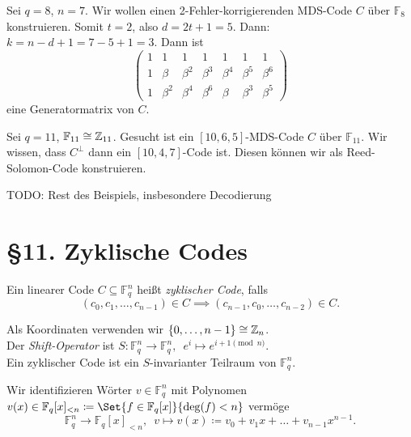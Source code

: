 \documentclass{cheat-sheet}
\newcommand{\F}{\mathbb{F}} %
\begin{document}

\begin{bsp}
  Sei $q = 8$, $n = 7$.
  Wir wollen einen 2-Fehler-korrigierenden MDS-Code $C$ über $\F_8$ konstruieren.
  Somit $t = 2$, also $d = 2t + 1 = 5$.
  Dann: $k = n - d + 1 = 7 - 5 + 1 = 3$.
  Dann ist
  \[
    \begin{pmatrix}
      1 & 1 & 1 & 1 & 1 & 1 & 1 \\
      1 & \beta & \beta^2 & \beta^3 & \beta^4 & \beta^5 & \beta^6 \\
      1 & \beta^2 & \beta^4 & \beta^6 & \beta & \beta^3 & \beta^5
    \end{pmatrix}
  \]
  eine Generatormatrix von $C$.
\end{bsp}

\begin{bsp}
  Sei $q = 11$, $\F_{11} \cong \Z_{11}$.
  Gesucht ist ein $[10, 6, 5]$-MDS-Code $C$ über $\F_{11}$.
  Wir wissen, dass $C^\perp$ dann ein $[10, 4, 7]$-Code ist.
  Diesen können wir als Reed-Solomon-Code konstruieren.
\end{bsp}

TODO: Rest des Beispiels, insbesondere Decodierung


\section{§11. Zyklische Codes}


\begin{defn}
  Ein linearer Code $C \subseteq \F_q^n$ heißt \emph{zyklischer Code}, falls
  \[
    (c_0, c_1, \ldots, c_{n-1}) \in C \implies
    (c_{n-1}, c_0, \ldots, c_{n-2}) \in C.
  \]
\end{defn}

\begin{bem}
  Als Koordinaten verwenden wir $\{ 0, \ldots, n-1 \} \cong \mathbb{Z}_n$. \\
  Der \emph{Shift-Operator} ist $S : \F_q^n \to \F_q^n, \enspace e^i \mapsto e^{i+1 \pmod{n}}$. \\
  Ein zyklischer Code ist ein $S$-invarianter Teilraum von $\F_q^n$.
\end{bem}

\begin{nota}
  Wir identifizieren Wörter $v \in \F_q^n$ mit Polynomen $v(x) \in \F_q[x]_{< n} \coloneqq \Set{f \in \F_q[x]}{\deg(f) < n}$ vermöge
  \[
    \F_q^n \to \F_q[x]_{< n}, \enspace
    v \mapsto v(x) \coloneqq v_0 + v_1 x + \ldots + v_{n-1} x^{n-1}.
  \]
\end{nota}
\end{document}

